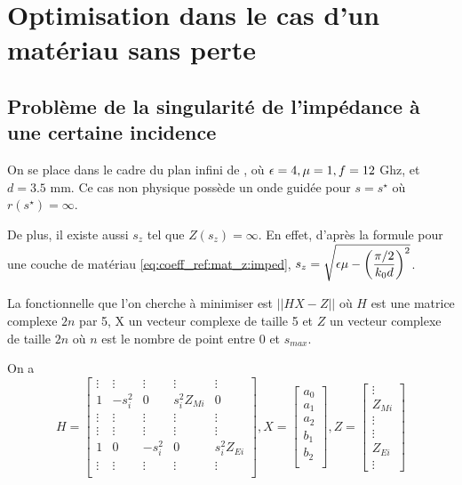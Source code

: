 \section{Optimisation dans le cas d'un matériau sans perte}

\subsection{Problème de la singularité de l'impédance à une certaine incidence}
On se place dans le cadre du plan infini de \cite{soudais_3d_2017}, où $\epsilon=4,\mu=1,f=12$ Ghz, et $d=3.5$ mm. Ce cas non physique possède un onde guidée pour $s=s^\star$ où $r(s^\star) = \infty$. 

De plus, il existe aussi $s_z$ tel que $Z(s_z) = \infty$. En effet, d'après la formule pour une couche de matériau \eqref{eq:coeff_ref:mat_z:imped}, $s_z = \sqrt{\epsilon \mu - \left(\dfrac{\pi/2}{k_0 d}\right)^2}$.

La fonctionnelle que l'on cherche à minimiser est $||H X - Z||$ où $H$ est une matrice complexe $2n$ par 5, X un vecteur complexe de taille 5 et $Z$ un vecteur complexe de taille $2n$ où $n$ est le nombre de point entre 0 et $s_{max}$. 


On a 
\[
  H = \begin{bmatrix}
  \vdots & \vdots & \vdots & \vdots &\vdots \\
  1 & -s_i^2 & 0 & s_i^2 Z_{Mi} & 0 \\
  \vdots & \vdots & \vdots & \vdots &\vdots \\
  \vdots & \vdots & \vdots & \vdots &\vdots \\
  1 & 0 &-s_i^2 & 0 & s_i^2 Z_{Ei} \\
  \vdots & \vdots & \vdots & \vdots &\vdots \\
  \end{bmatrix},
  X = \begin{bmatrix}
  a_0\\
  a_1\\
  a_2\\
  b_1\\
  b_2\\
  \end{bmatrix},
  Z=\begin{bmatrix}
  \vdots\\
  Z_{Mi}\\
  \vdots\\
  \vdots\\
  Z_{Ei}\\
  \vdots
  \end{bmatrix}
\]

